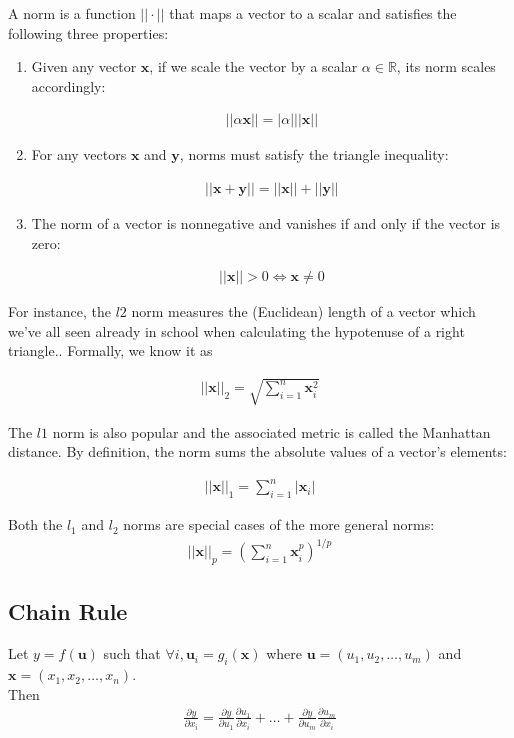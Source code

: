 \documentclass[a4paper,12pt]{article}
\theoremstyle{definition}
\newcommand{\R}{\mathbb{R}}
\begin{document}
A norm is a function $||\cdot||$ that maps a vector to a scalar and satisfies the following three properties:
\begin{enumerate}
    \item Given any vector $\mathbf{x}$, if we scale the vector by a scalar $\alpha \in \R$, its norm scales accordingly:

          \begin{align*}
              ||\alpha\mathbf{x}|| = |\alpha|||\mathbf{x}||
          \end{align*}

    \item For any vectors $\mathbf{x}$ and $\mathbf{y}$, norms must satisfy the triangle inequality:

          \begin{align*}
              ||\mathbf{x} + \mathbf{y}|| = ||\mathbf{x}|| + ||\mathbf{y}||
          \end{align*}

    \item The norm of a vector is nonnegative and vanishes if and only if the vector is zero:

          \begin{align*}
              ||\mathbf{x}|| > 0 \iff \mathbf{x} \neq 0
          \end{align*}

\end{enumerate}
For instance, the $l2$ norm measures the (Euclidean) length of a vector which we've all seen already in school when calculating the hypotenuse of a right triangle..
Formally, we know it as

\begin{align*}
    ||\mathbf{x}||_2 = \sqrt{\sum_{i=1}^{n}\mathbf{x}_i^2}
\end{align*}

The $l1$ norm is also popular and the associated metric is called the Manhattan distance. By definition, the
norm sums the absolute values of a vector's elements:

\begin{align*}
    ||\mathbf{x}||_1 = \sum_{i=1}^{n}|\mathbf{x}_i|
\end{align*}

Both the $l_1$ and $l_2$ norms are special cases of the more general norms:
\begin{align*}
    ||\mathbf{x}||_p = \left({\sum_{i=1}^{n}\mathbf{x}_i^p}\right)^{1/p}
\end{align*}
\subsection*{Chain Rule}
Let $y = f(\mathbf{u})$ such that $\forall i, \mathbf{u}_i = g_i(\mathbf{x})$ where $\mathbf{u} = (u_1, u_2, \ldots, u_m)$ and $\mathbf{x} = (x_1, x_2, \ldots, x_n)$. \\
Then
\begin{align*}
    \frac{\partial y}{\partial x_i} = \frac{\partial y}{\partial u_1}\frac{\partial u_1}{\partial x_i} + \ldots + \frac{\partial y}{\partial u_m}\frac{\partial u_m}{\partial x_i}
\end{align*}
\end{document}
